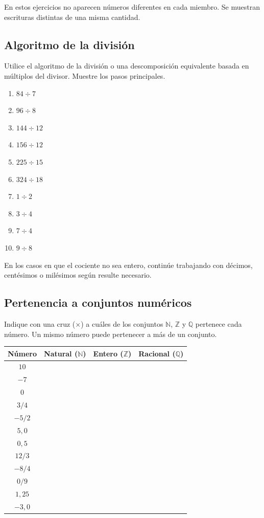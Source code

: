En estos ejercicios no aparecen números diferentes en cada miembro. Se muestran escrituras distintas de una misma cantidad.

\subsection*{Algoritmo de la división}

Utilice el algoritmo de la división o una descomposición equivalente basada en múltiplos del divisor. Muestre los pasos principales.

\begin{enumerate}
\item \(84\div7\)
\item \(96\div8\)
\item \(144\div12\)
\item \(156\div12\)
\item \(225\div15\)
\item \(324\div18\)
\item \(1\div2\)
\item \(3\div4\)
\item \(7\div4\)
\item \(9\div8\)
\end{enumerate}

En los casos en que el cociente no sea entero, continúe trabajando con décimos, centésimos o milésimos según resulte necesario.

\subsection*{Pertenencia a conjuntos numéricos}

Indique con una cruz (\(\times\)) a cuáles de los conjuntos \(\mathbb N\), \(\mathbb Z\) y \(\mathbb Q\) pertenece cada número. Un mismo número puede pertenecer a más de un conjunto.

\begin{center}
\begin{tabular}{c|c|c|c}
  Número & Natural (\(\mathbb{N}\)) & Entero (\(\mathbb{Z}\)) & Racional (\(\mathbb{Q}\)) \\ \hline
\(10\) & & & \\ \hline
\(-7\) & & & \\ \hline
\(0\) & & & \\ \hline
\(3/4\) & & & \\ \hline
\(-5/2\) & & & \\ \hline
\(5{,}0\) & & & \\ \hline
\(0{,}5\) & & & \\ \hline
\(12/3\) & & & \\ \hline
\(-8/4\) & & & \\ \hline
\(0/9\) & & & \\ \hline
\(1{,}25\) & & & \\ \hline
\(-3{,}0\) & & &  
\end{tabular}
\end{center}

